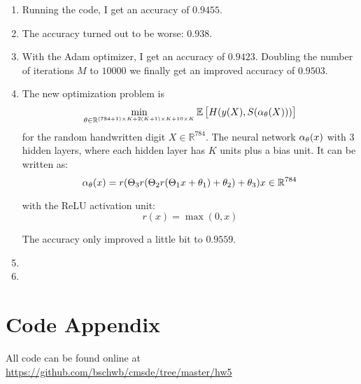 \documentclass[a4paper,11pt]{scrartcl}
\newcommand*{\R}{\mathbb{R}}
\newcommand*{\EV}[1]{\mathbb{E}\left[{#1}\right]}
\newcommand*{\bt}{\bold{\theta}}
\begin{document}
\begin{enumerate}

\item
  Running the code, I get an accuracy of $0.9455$.

\item
  The accuracy turned out to be worse: $0.938$.

\item
  With the Adam optimizer, I get an accuracy of $0.9423$.
  Doubling the number of iterations $M$ to $10000$ we finally get an improved
  accuracy of $0.9503$.

\item
  The new optimization problem is
  \[ \min_{\bt \in \R^{(784+1)\times K + 2 (K+1) \times K + 10 \times K}} \EV{H(y(X), S(\alpha_\bt(X)))}\]
  for the random handwritten digit $X \in \R^{784}$. The neural network
  $\alpha_\bt(x)$ with 3 hidden layers, where each hidden layer has $K$ units plus a bias unit.
  It can be written as:
  \[ \alpha_\bt(x) = r(\Theta_3 r(\Theta_2 r(\Theta_1 x + \theta_1) + \theta_2)
    + \theta_3) x \in \R^{784} \]

  with the ReLU activation unit:
  \[ r(x) = \max(0, x)\]

  The accuracy only improved a little bit to $0.9559$.


\item

\item


\end{enumerate}

\section*{Code Appendix}

All code can be found online at
\url{https://github.com/bschwb/cmsde/tree/master/hw5}

% 

% 
\end{document}
